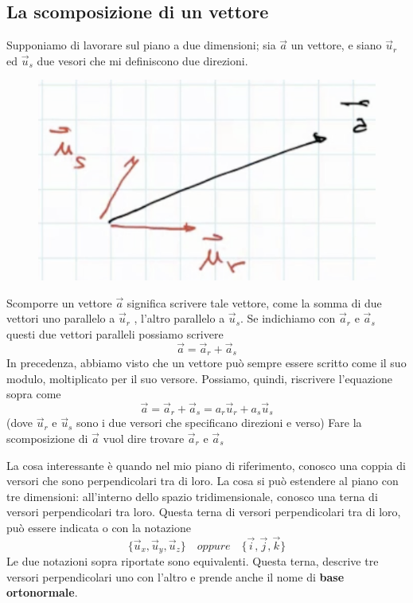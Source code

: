 \subsection{La scomposizione di un vettore}
Supponiamo di lavorare sul piano a due dimensioni; sia $\overrightarrow{a} $ un vettore, e siano $\overrightarrow{u}_{r}$ ed $\overrightarrow{u}_{s}$ due vesori che mi definiscono due direzioni.

\begin{figure}[h]
\begin{center}
\includegraphics[width = 0.5 \textwidth]{lezione1/images/scomposizione1}
\label{fig:scomposizione1}
\end{center}
\end{figure}

Scomporre un vettore $\overrightarrow{a} $ significa scrivere tale vettore, come la somma di due vettori uno parallelo a $\overrightarrow{u}_{r}$ , l'altro parallelo a $\overrightarrow{u}_{s}$. Se indichiamo con $ \overrightarrow{a}_{r}$ e $ \overrightarrow{a}_{s}$ questi due vettori paralleli possiamo scrivere
$$ \overrightarrow{a} = \overrightarrow{a}_{r} + \overrightarrow{a}_{s} $$
In precedenza, abbiamo visto che un vettore può sempre essere scritto come il suo modulo, moltiplicato per il suo versore. Possiamo, quindi, riscrivere l'equazione sopra come
$$ \overrightarrow{a} = \overrightarrow{a}_{r} + \overrightarrow{a}_{s} = a_{r}\overrightarrow{u}_{r} + a_{s}\overrightarrow{u}_{s} $$ (dove $ \overrightarrow{u}_{r} $ e  $ \overrightarrow{u}_{s} $ sono i due versori che specificano direzioni e verso)
Fare la scomposizione di $\overrightarrow{a}$ vuol dire trovare $ \overrightarrow{a}_{r} $ e $ \overrightarrow{a}_{s} $

La cosa interessante è quando nel mio piano di riferimento, conosco una coppia di versori che sono perpendicolari tra di loro. La cosa si può estendere al piano con tre dimensioni: all'interno dello spazio tridimensionale, conosco una terna di versori perpendicolari tra loro. 
Questa terna di versori perpendicolari tra di loro, può essere indicata o con la notazione $$\lbrace\overrightarrow{u}_{x}, \overrightarrow{u}_{y},  \overrightarrow{u}_{z}\rbrace \quad oppure \quad \lbrace \overrightarrow{i}, \overrightarrow{j}, \overrightarrow{k}\rbrace $$
Le due notazioni sopra riportate sono equivalenti.
Questa terna, descrive tre versori perpendicolari uno con l'altro e prende anche il nome di \textbf{base ortonormale}.

